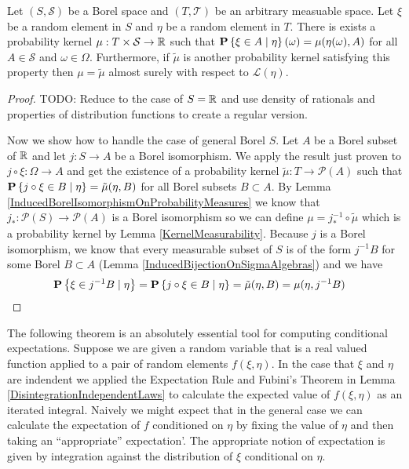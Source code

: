 \begin{thm}\label{ExistenceConditionalDistribution}Let $(S, \mathcal{S})$ be a Borel space and
  $(T, \mathcal{T})$ be an arbitrary measuable space.  Let $\xi$ be a
  random element in $S$ and $\eta$ be a random element in $T$.  There
  is exists a probability kernel $\mu : T \times \mathcal{S} \to
  \mathbb{R}$ such that $\textbf{P} \left \{\xi \in A \mid \eta  \right \}(\omega) =
  \mu(\eta(\omega), A)$ for all $A \in \mathcal{S}$ and $\omega \in
  \Omega$.  Furthermore, if $\tilde{\mu}$ is another probability
  kernel satisfying this property then $\mu = \tilde{\mu}$ almost
  surely with respect to $\mathcal{L}(\eta)$.
\end{thm}
\begin{proof}
TODO:  Reduce to the case of $S = \mathbb{R}$ and use density of rationals
and properties of distribution functions to create a regular version.

Now we show how to handle the case of general Borel $S$.  Let $A$ be a
Borel subset of $\mathbb{R}$ and let $j : S \to A$ be a Borel
isomorphism.  We apply the result just proven to $j  \circ \xi :
\Omega \to A$ and get the existence of a probability kernel $\tilde{\mu} : T
\to \mathcal{P}(A)$ such that $\textbf{P} \left \{j \circ \xi \in B \mid \eta \right \}
= \tilde{\mu}(\eta, B)$ for all Borel subsets $B \subset A$.  By Lemma
\ref{InducedBorelIsomorphismOnProbabilityMeasures} we know that $j_* :
\mathcal{P}(S) \to \mathcal{P}(A)$ is a Borel isomorphism so we can
define $\mu = j^{-1}_* \circ \tilde{\mu}$ which is a
probability kernel by Lemma \ref{KernelMeasurability}.  Because $j$ is
a Borel isomorphism, we know that every measurable subset of $S$ is of
the form $j^{-1}B$ for some Borel $B \subset A$ (Lemma
\ref{InducedBijectionOnSigmaAlgebras}) and we have
\begin{align*}
\textbf{P} \left \{\xi \in j^{-1}B \mid \eta \right \} &= \textbf{P} \left \{j \circ
  \xi \in B \mid \eta \right \} = \tilde{\mu}(\eta, B) = \mu(\eta, j^{-1}B)
\end{align*}
\end{proof}

The following theorem is an absolutely essential tool for computing
conditional expectations.  Suppose we are given a random variable that is a real valued function applied
to  a pair of random elements $f(\xi, \eta)$.   In the case that $\xi$ and $\eta$ are indendent we applied the Expectation
Rule and Fubini's Theorem in Lemma \ref{DisintegrationIndependentLaws} to calculate the expected value of $f(\xi, \eta)$ as an
iterated integral.  Naively we might expect that in the general case we can calculate the expectation
of $f$ conditioned on $\eta$ by fixing the value of $\eta$ and then taking an ``appropriate'' expectation'.  The 
appropriate notion of expectation is given by integration against the distribution of $\xi$ conditional on $\eta$.

